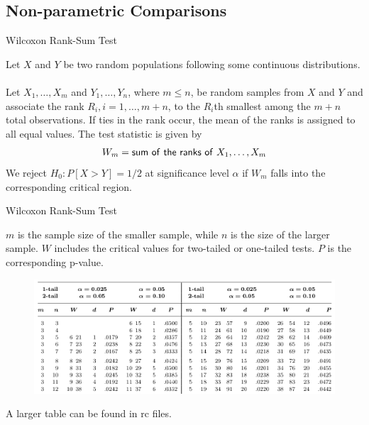 \subsection{Non-parametric Comparisons}


\begin{frame}{Wilcoxon Rank-Sum Test}

\justifying
{} Let $X$ and $Y$ be two random populations following some continuous distributions. \\
~\\
Let $X_1, \ldots, X_m$ and $Y_1, \ldots, Y_n$, where $m\leq n$, be random samples from $X$ and $Y$ and associate the rank $R_i, i = 1,\ldots, m+n$, to the $R_i$th smallest among the $m+n$ total observations. If ties in the rank occur, the mean of the ranks is assigned to all equal values. The test statistic is given by
\begin{align*}
W_m = \mathsf{sum\ of\ the\ ranks\ of\ } X_1, \ldots, X_m
\end{align*}
We reject $H_0: P[X > Y] = 1/2$ at significance level $\alpha$ if $W_m$ falls into the corresponding critical region. 


\end{frame}


\begin{frame}{Wilcoxon Rank-Sum Test}

\justifying
{} $m$ is the sample size of the smaller sample, while $n$ is the size of the larger sample. $W$ includes the critical values for two-tailed or one-tailed tests. $P$ is the corresponding p-value.
\begin{figure}[htbp]
	\centering
	\includegraphics[width=\linewidth]{./images/rc6fig1.png}
\end{figure}
A larger table can be found in rc files.

\end{frame}



